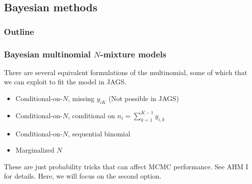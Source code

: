 \documentclass[color=usenames,dvipsnames]{beamer}\usepackage[]{graphicx}\usepackage[]{xcolor}
\begin{document}
\subsection{Bayesian methods}


\begin{frame}
  \frametitle{Outline}
  \Large
\end{frame}


\begin{frame}
  \frametitle{Bayesian multinomial $N$-mixture models}
  There are several equivalent formulations of the multinomial, some
  of which that we can exploit to fit the model in JAGS. \\
  
  \begin{itemize}
    \item Conditional-on-$N$, missing $y_{iK}$ (Not possible in JAGS)
    \item Conditional-on-$N$, conditional on $n_i=\sum_{k=1}^{K-1} y_{i,k}$
    \item Conditional-on-$N$, sequential binomial
    \item Marginalized $N$
  \end{itemize}
  \pause
  \vfill
  These are just probability tricks that can affect MCMC
  performance. See AHM I for details. Here, we will focus on the second
  option. \\ 
\end{frame}









\end{document}
